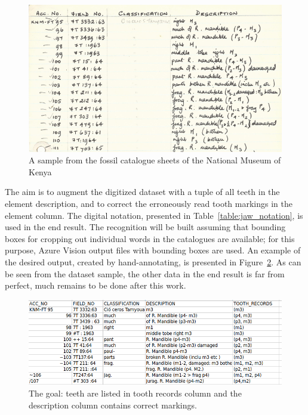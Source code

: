 \documentclass[english,twoside,openright]{UH_DS_MSc}
\begin{document}
\begin{figure}[ht]
    \centering
    \includegraphics*[scale=0.5]{images/cataloguesample3.png}
    \caption{A sample from the fossil catalogue sheets of the National Museum of Kenya}
    \label{image:cataloguesample}
\end{figure}

The aim is to augment the digitized dataset with a tuple of all teeth in the 
element description, and to correct the erroneously read tooth markings in the element column.
The digital notation, presented in Table~\ref{table:jaw_notation}, is used in the end result.
The recognition will be built assuming that bounding boxes for cropping out individual words in the 
catalogues are available; for this purpose, Azure Vision output files with bounding boxes
are used. An example of the desired output,
created by hand-annotating, is presented in Figure~\ref{image:goal}. 
As can be seen from the dataset sample, the other data in the end result is far from perfect, much remains to be done after this work.

\begin{figure}[ht]
    \centering
    \includegraphics*[scale=0.5]{images/goal.png}
    \caption{The goal: teeth are listed in tooth records column and the description column contains correct markings.}
    \label{image:goal}
\end{figure}
\end{document}
